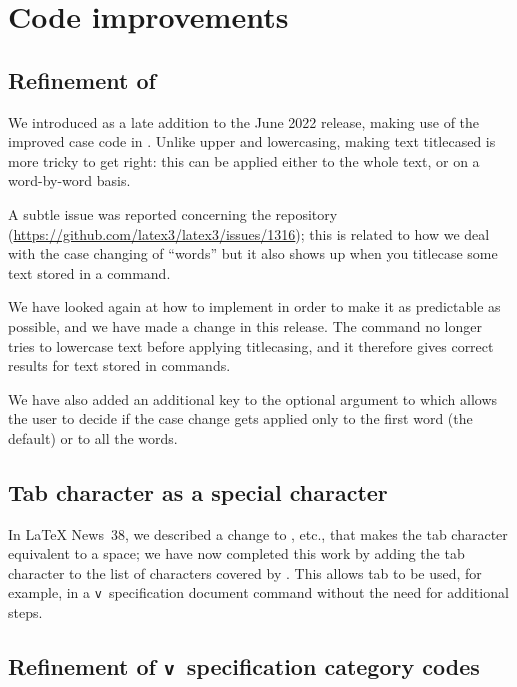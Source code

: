\documentclass{ltnews}
\begin{document}
\section{Code improvements}

\subsection{Refinement of }

We introduced  as a late addition to the June 2022
release, making use of the improved case code in . Unlike
upper and lowercasing, making text titlecased is more tricky to get
right: this can be applied either
to the whole text, or on a word-by-word
basis.

A subtle issue was reported concerning the  repository
(\url{https://github.com/latex3/latex3/issues/1316}); this is related
to how we deal with the case changing of \enquote{words} but it also
shows up when you titlecase some text stored in a command.

We have looked again at how to implement  in order
to make it as predictable as possible, and we have made a change in
this release. The command no longer tries to lowercase text before
applying titlecasing, and it therefore gives correct results for text
stored in commands.

We have also added an additional key to the optional argument to
 which allows the user to decide if the case change
gets applied only to the first word (the default) or to all the words.


\subsection{Tab character as a special character}

In \LaTeX{} News~38, we described a change to , etc., that
makes the tab character equivalent to a space; we have now completed
this work by adding the tab character to the list of characters
covered by .  This allows tab to be used, for example,
in a \texttt{v}~specification document command without the need for
additional steps.


\subsection{Refinement of \texttt{v}~specification category codes}
\end{document}
